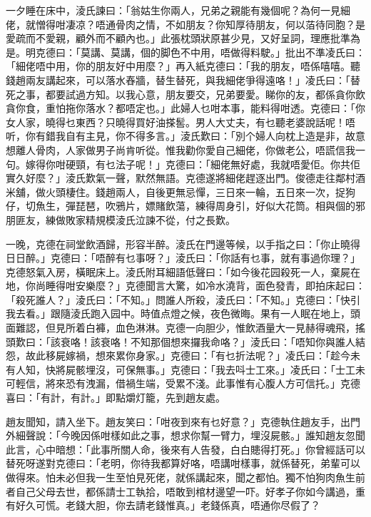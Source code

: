 \documentclass[a5paper, 12pt, openany]{book} %
\begin{document}
	一夕睡在床中，淩氏諫曰：「翁姑生你兩人，兄弟之親能有幾個呢？為何一見細佬，就憎得咁凄凉？唔通骨肉之情，不如朋友？你知厚待朋友，何以萡待同胞？是愛疏而不愛親，顧外而不顧內也。」此張枕頭狀原甚少見，又好呈詞，理應批準為是。明克德曰：「莫講、莫講，個的脚色不中用，唔做得料駛。」批出不準凌氏曰：「細佬唔中用，你的朋友好中用麼？」再入紙克德曰：「我的朋友，唔係嘻嘻。聽錢趙兩友講起來，可以落水舂牆，替生替死，與我細佬爭得遠咯！」凌氏曰：「替死之事，都要試過方知。以我心意，朋友要交，兄弟要愛。睇你的友，都係貪你飲貪你食，重怕拖你落水？都唔定也。」此婦人乜咁本事，能料得咁透。克德曰：「你女人家，曉得乜東西？只曉得買好油搽䯻。男人大丈夫，有乜聽老婆說話呢！唔听，你有錯我自有主見，你不得多言。」淩氏歎曰：「別个婦人向枕上造是非，故意想離人骨肉，人家做男子尚肯听從。惟我勸你愛自己細佬，你做老公，唔謊信我一句。嫁得你咁硬頸，有乜法子呢！」克德曰：「細佬無好處，我就唔愛佢。你共佢實久好麼？」淩氏歎氣一聲，默然無語。克德遂將細佬趕逐出門。俊德走往鄰村酒米舖，做火頭棲住。錢趙兩人，自後更無忌憚，三日來一輪，五日來一次，捉狗仔，切魚生，彈琵琶，吹鴉片，嫖賭飲蕩，練得周身引，好似大花筒。相與個的邪朋匪友，練做敗家精規模淩氏泣諫不從，付之長歎。

	一晚，克德在祠堂飲酒歸，形容半醉。淩氏在門邊等候，以手指之曰：「你止曉得日日醉。」克德曰：「唔醉有乜事呀？」淩氏曰：「你話有乜事，就有事過你理？」克德怒氣入房，橫眠床上。淩氏附耳細語低聲曰：「如今後花园殺死一人，棄屍在地，你尚睡得咁安樂麼？」克德聞言大驚，如冷水澆背，面色發青，即拍床起曰：「殺死誰人？」淩氏曰：「不知。」問誰人所殺，淩氏曰：「不知。」克德曰：「快引我去看。」跟隨淩氏跑入园中。時值点燈之候，夜色微晦。果有一人眠在地上，頭面難認，但見所着白褲，血色淋淋。克德一向胆少，惟飲酒量大一見赫得魂飛，搖頭歎曰：「該衰咯！該衰咯！不知那個想來攞我命咯？」淩氏曰：「唔知你與誰人結怨，故此移屍嫁禍，想來累你身家。」克德曰：「有乜折法呢？」凌氏曰：「趁今未有人知，快將屍骸埋沒，可保無事。」克德曰：「我去呌士工來。」凌氏曰：「士工未可輕信，將來恐有洩漏，借禍生端，受累不淺。此事惟有心腹人方可信托。」克德喜曰：「有計，有計。」即點爝灯籠，先到趙友處。

	趙友聞知，請入坐下。趙友笑曰：「咁夜到來有乜好意？」克德執住趙友手，出門外細聲說：「今晚因係咁樣如此之事，想求你幫一臂力，埋沒屍骸。」誰知趙友忽聞此言，心中暗想：「此事所關人命，後來有人告發，白白贃得打死。」你曾經話可以替死呀遂對克德曰：「老明，你待我都算好咯，唔講咁樣事，就係替死，弟輩可以做得來。怕未必但我一生至怕見死佬，就係講起來，聞之都怕。獨不怕狗肉魚生前者自己父母去世，都係請士工執拾，唔敢到棺材邊望一吓。好孝子你如今講過，重有好久可慌。老錢大胆，你去請老錢惟真。」老錢係真，唔通你尽假了？
\end{document}

